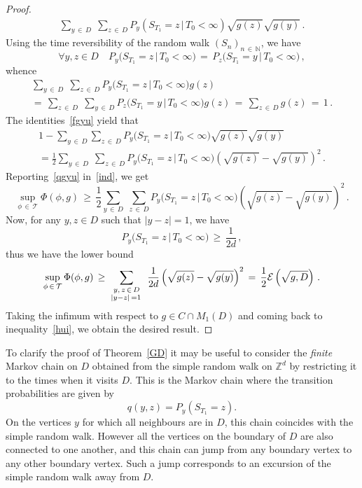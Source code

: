 \documentclass[10pt]{amsart}
\theoremstyle{definition}\newtheorem{defi}[theo]{Definition}\newtheorem{rema}[theo]{Remark}\newtheorem{exam}[theo]{Example}\newtheorem{exem}[theo]{Example}\newtheorem{nota}[theo]{Notation}
\newcommand{\tatop}[2]{\genfrac{}{}{0pt}{1}{#1}{#2}}
\newcommand*\N {{\mathbb N}}
\newcommand*\T{\mathcal{T}}
\newcommand{\cE}{\mathcal{E}}
\renewcommand{\N}{\mathbb{N}}
\let\oldforall\forall
\renewcommand*{\forall}{\mathrel{\oldforall}}
\begin{document}
\begin{proof}
\begin{multline}
\sum_{y\,\in\,D}\;
\sum_{z\,\in\,D} P_y\left(S_{T_1}=z \,\big|\,T_0<\infty\right)
\sqrt{ g(z) } { \sqrt{g(y)}}
\,.
\end{multline}
Using the time reversibility of the random walk $(S_n)_{n\,\in\,\N}$, we have
\begin{equation}\label{wgyu}
\forall y,z\in D\quad P_y\big(S_{T_1}=z \,\big|\,T_0<\infty\big)
\,=\, P_z\big(S_{T_1}=y \,\big|\,T_0<\infty\big)
\,,
\end{equation}
whence
\begin{multline}\label{fgyu}
\sum_{y\,\in\,D}\;
\sum_{z\,\in\,D} P_y\big(S_{T_1}=z \,\big|\,T_0<\infty\big) g(z) \\
=\,\sum_{z\,\in\,D}\;
\sum_{y\,\in\,D} P_z\big(S_{T_1}=y \,\big|\,T_0<\infty\big) g(z)
\,=\,
\sum_{z\,\in\,D} g(z)
\,=\,1\,.
\end{multline}
The identities~\eqref{fgyu} yield that
\begin{multline}\label{qgyu}
1 -
\sum_{y\,\in\,D}
\sum_{z\,\in\,D} P_y\big(S_{T_1}=z \,\big|\,T_0<\infty\big)
\sqrt{ g(z) } { \sqrt{g(y)}}\\
=\frac{1}{2}
\sum_{y\,\in\,D}\;
\sum_{z\,\in\,D} P_y\big(S_{T_1}=z \,\big|\,T_0<\infty\big)
\left(\sqrt{ g(z) }- { \sqrt{g(y)}}\right)^2\,.
\end{multline}
Reporting~\eqref{qgyu} in~\eqref{ind}, we get
\begin{equation}\label{wqx}
{\sup_{\phi\,\in\,\T} \Phi(\phi,g)}
\,\geq\,
\frac{1}{2}
\sum_{y\,\in\,D}\;
\sum_{z\,\in\,D} P_y\big(S_{T_1}=z \,\big|\,T_0<\infty\big)
\left(\sqrt{ g(z) }- { \sqrt{g(y)}}\right)^2\,.
\end{equation}
Now, for any $y,z\in D$ such that ${|y-z|=1}$, we have
\[
P_y\big(S_{T_1}=z \,\big|\,T_0<\infty\big)
\,\geq\, \frac{1}{2d}\,,
\]
thus we have the lower bound
\begin{equation}\label{ine}
{\sup_{\phi\,\in\,\T} \Phi(\phi,g)}
\,\geq\,
\sum_{\tatop{y,\,z\,\in\,D}{|y-z|\,=1\,}}\:
\frac{1}{2d}
\left(\sqrt{ g(z) }- {\sqrt{g(y)}}\right)^2
\,=\,\frac{1}{2}\cE\left(\sqrt{g,D}\right)
\,.
\end{equation}
Taking the infimum with respect to ${g\in C\cap M_1(D) }$ and coming back to inequality~\eqref{hui}, we obtain the desired result.
\end{proof}

To clarify the proof of Theorem~\ref{GD} it may be useful to consider the \emph{finite} Markov chain on $D$ obtained from the simple random walk on $\mathbb{Z}^d$ by restricting it to the times when it visits $D$. This is the Markov chain where the transition probabilities are given by
\[
q(y,z) = P_y(S_{T_1} = z).
\]
On the vertices $y$ for which all neighbours are in $D$, this chain coincides with the simple random walk. However all the vertices on the boundary of $D$ are also connected to one another, and this chain can jump from any boundary vertex to any other boundary vertex. Such a jump corresponds to an excursion of the simple random walk away from $D$.
\end{document}
